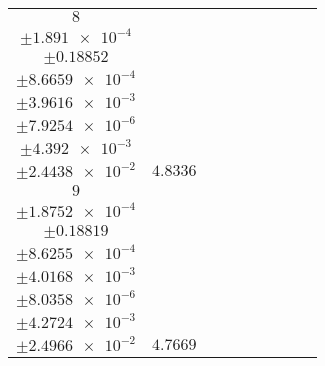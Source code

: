 \documentclass[8pt]{article}
\begin{document}
\begin{longtable}[l]{c c c c c c c c c}
$\num{8}$ & \begin{tabular}[c]{@{}c@{}}$\num{6.4474e-2}$ \\ $\pm\num{1.891e-4}$\end{tabular} & \begin{tabular}[c]{@{}c@{}}$\num{-5.9375e-2}$ \\ $\pm\num{0.18852}$\end{tabular} & \begin{tabular}[c]{@{}c@{}}$\num{-3.154}$ \\ $\pm\num{8.6659e-4}$\end{tabular} & \begin{tabular}[c]{@{}c@{}}$\num{3.5798e+3}$ \\ $\pm\num{3.9616e-3}$\end{tabular} & \begin{tabular}[c]{@{}c@{}}$\num{7.1615}$ \\ $\pm\num{7.9254e-6}$\end{tabular} & \begin{tabular}[c]{@{}c@{}}$\num{1.6392}$ \\ $\pm\num{4.392e-3}$\end{tabular} & \begin{tabular}[c]{@{}c@{}}$\num{4.2021}$ \\ $\pm\num{2.4438e-2}$\end{tabular} & $\num{4.8336}$\\
$\num{9}$ & \begin{tabular}[c]{@{}c@{}}$\num{6.3538e-2}$ \\ $\pm\num{1.8752e-4}$\end{tabular} & \begin{tabular}[c]{@{}c@{}}$\num{0.31562}$ \\ $\pm\num{0.18819}$\end{tabular} & \begin{tabular}[c]{@{}c@{}}$\num{3.1522}$ \\ $\pm\num{8.6255e-4}$\end{tabular} & \begin{tabular}[c]{@{}c@{}}$\num{3.586e+3}$ \\ $\pm\num{4.0168e-3}$\end{tabular} & \begin{tabular}[c]{@{}c@{}}$\num{7.174}$ \\ $\pm\num{8.0358e-6}$\end{tabular} & \begin{tabular}[c]{@{}c@{}}$\num{1.5952}$ \\ $\pm\num{4.2724e-3}$\end{tabular} & \begin{tabular}[c]{@{}c@{}}$\num{4.4086}$ \\ $\pm\num{2.4966e-2}$\end{tabular} & $\num{4.7669}$\\

\end{longtable}
\end{document}
